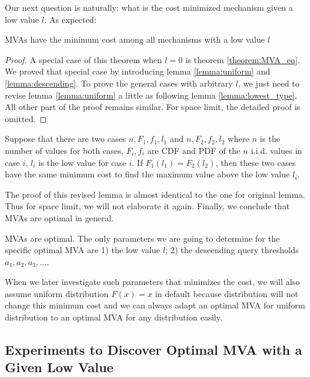 Our next question is naturally: what is the cost minimized mechanism
given a low value $l$. As expected:

\begin{theorem}

MVAs have the minimum cost among all mechanisms with a low value $l$

\end{theorem}

\begin{proof}
A special case of this theorem when $l = 0$ is theorem \ref{theorem:MVA_eq}.
We proved that special case by introducing lemma \ref{lemma:uniform} and
\ref{lemma:descending}. To prove the general cases with arbitrary $l$, we just
need to revise lemma \ref{lemma:uniform} a little as following lemma
\ref{lemma:lowest_type}. All other part of the proof remains similar. For space
limit, the detailed proof is omitted.
\end{proof}

\begin{lemma}\label{lemma:lowest_type}
Suppose that there are two cases $n, F_1, f_1, l_1$ and $n, F_2, f_2, l_2$
where $n$ is the number of values for both cases, $F_i, f_i$ are CDF and PDF
of the $n$ i.i.d. values in case $i$, $l_i$ is the low value for case $i$.
If $F_1(l_1) = F_2(l_2)$, then these two cases have the same minimum cost
to find the maximum value above the low value $l_i$.
\end{lemma}

The proof of this revised lemma is almost identical to the one for original
lemma. Thus for space limit, we will not elaborate it again. Finally, we conclude
that MVAs are optimal in general.

\begin{corollary}

MVAs are optimal. The only parameters we are going to determine for the
specific optimal MVA are 1) the low value $l$; 2) the descending query
thresholds $a_1, a_2, a_3, \ldots$.

\end{corollary}

When we later investigate such parameters that minimizes the cost, we will
also assume uniform distribution $F(x) = x$ in default because distribution will not
change this minimum cost and we can always adapt an optimal MVA for uniform distribution
to an optimal MVA for any distribution easily.

\subsection{Experiments to Discover Optimal MVA with a Given Low Value}

